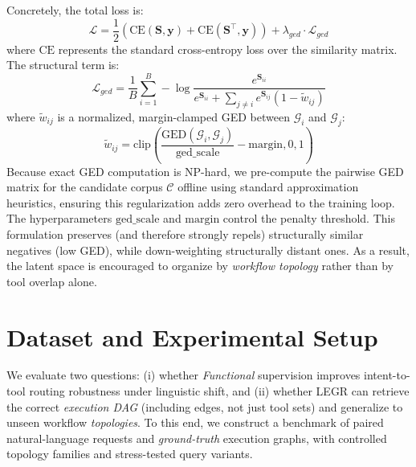 \documentclass{article}
\begin{document}
Concretely, the total loss is:
\begin{equation}
\mathcal{L} = \frac{1}{2} \left( \text{CE}(\mathbf{S}, \mathbf{y}) + \text{CE}(\mathbf{S}^\top, \mathbf{y}) \right) + \lambda_{ged} \cdot \mathcal{L}_{ged}
\end{equation}
where $\text{CE}$ represents the standard cross-entropy loss over the similarity matrix. The structural term is:
\begin{equation}
\mathcal{L}_{ged} = \frac{1}{B} \sum_{i=1}^B -\log \frac{e^{\mathbf{S}_{ii}}}{e^{\mathbf{S}_{ii}} + \sum_{j \neq i} e^{\mathbf{S}_{ij}}(1 - \tilde{w}_{ij})}
\end{equation}
where $\tilde{w}_{ij}$ is a normalized, margin-clamped GED between $\mathcal{G}_i$ and $\mathcal{G}_j$:
\begin{equation}
\tilde{w}_{ij} = \text{clip} \left( \frac{\text{GED}(\mathcal{G}_i, \mathcal{G}_j)}{\text{ged\_scale}} - \text{margin}, 0, 1 \right)
\end{equation}
Because exact GED computation is NP-hard, we pre-compute the pairwise GED matrix for the candidate corpus $\mathcal{C}$ offline using standard approximation heuristics, ensuring this regularization adds zero overhead to the training loop. The hyperparameters $\text{ged\_scale}$ and $\text{margin}$ control the penalty threshold. This formulation preserves (and therefore strongly repels) structurally similar negatives (low GED), while down-weighting structurally distant ones. As a result, the latent space is encouraged to organize by \emph{workflow topology} rather than by tool overlap alone.



\section{Dataset and Experimental Setup}

We evaluate two questions: (i) whether \emph{Functional} supervision improves intent-to-tool routing robustness under linguistic shift, and (ii) whether LEGR can retrieve the correct \emph{execution DAG} (including edges, not just tool sets) and generalize to unseen workflow \emph{topologies}. To this end, we construct a benchmark of paired natural-language requests and \emph{ground-truth} execution graphs, with controlled topology families and stress-tested query variants.
\end{document}
